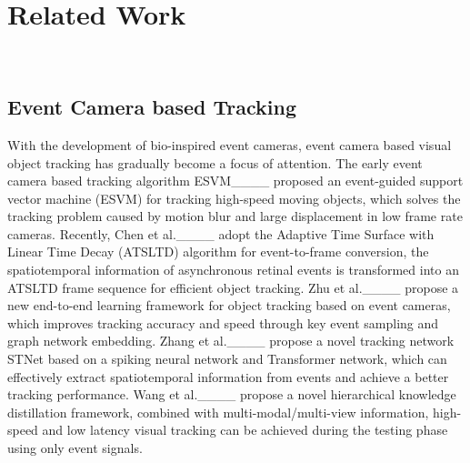 \section{Related Work}
~\label{sec:Related Work} 




\subsection{Event Camera based Tracking}  \label{subsec:eventtracking}
With the development of bio-inspired event cameras, event camera based visual object tracking has gradually become a focus of attention. The early event camera based tracking algorithm ESVM____ proposed an event-guided support vector machine (ESVM) for tracking high-speed moving objects, which solves the tracking problem caused by motion blur and large displacement in low frame rate cameras. Recently, Chen et al.____ adopt the Adaptive Time Surface with Linear Time Decay (ATSLTD) algorithm for event-to-frame conversion, the spatiotemporal information of asynchronous retinal events is transformed into an ATSLTD frame sequence for efficient object tracking. Zhu et al.____ propose a new end-to-end learning framework for object tracking based on event cameras, which improves tracking accuracy and speed through key event sampling and graph network embedding. Zhang et al.____ propose a novel tracking network STNet based on a spiking neural network and Transformer network, which can effectively extract spatiotemporal information from events and achieve a better tracking performance. Wang et al.____ propose a novel hierarchical knowledge distillation framework, combined with multi-modal/multi-view information, high-speed and low latency visual tracking can be achieved during the testing phase using only event signals. 


